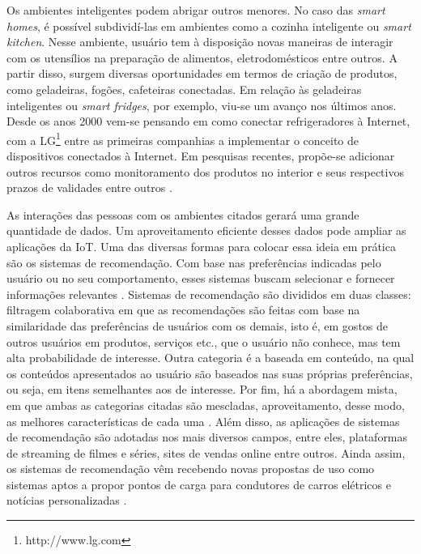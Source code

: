 Os ambientes inteligentes podem abrigar outros menores. No caso das \textit{smart homes}, é possível subdividí-las em ambientes como a cozinha inteligente ou \textit{smart kitchen}. Nesse ambiente, usuário tem à disposição novas maneiras de interagir com os utensílios na preparação de alimentos, eletrodomésticos entre outros. A partir disso, surgem diversas oportunidades em termos de criação de produtos, como geladeiras, fogões, cafeteiras conectadas. Em relação às geladeiras inteligentes ou \textit{smart fridges}, por exemplo, viu-se um avanço nos últimos anos. Desde os anos 2000 vem-se pensando em como conectar refrigeradores à Internet, com a LG\textsuperscript{\textregistered}\footnote{http://www.lg.com} entre as primeiras companhias a implementar o conceito de dispositivos conectados à Internet. Em pesquisas recentes, propõe-se adicionar outros recursos como monitoramento dos produtos no interior e seus respectivos prazos de validades entre outros \cite{Hachani2016}. 

As interações das pessoas com os ambientes citados gerará uma grande quantidade de dados. Um aproveitamento eficiente desses dados pode ampliar as aplicações da IoT. Uma das diversas formas para colocar essa ideia em prática são os sistemas de recomendação. Com base nas preferências indicadas pelo usuário ou no seu comportamento, esses sistemas buscam selecionar e fornecer informações relevantes \cite{Filho2008}. Sistemas de recomendação são divididos em duas classes: filtragem colaborativa em que as recomendações são feitas com base na similaridade das preferências de usuários com os demais, isto é, em gostos de outros usuários em produtos, serviços etc., que o usuário não conhece, mas tem alta probabilidade de interesse. Outra categoria é a baseada em conteúdo, na qual os conteúdos apresentados ao usuário são baseados nas suas próprias preferências, ou seja, em itens semelhantes aos de interesse. Por fim, há a abordagem mista, em que ambas as categorias citadas são mescladas, aproveitamento, desse modo, as melhores características de cada uma \cite{Thomas2016}.
Além disso, as aplicações de sistemas de recomendação são adotadas nos mais diversos campos, entre eles, plataformas de streaming de filmes e séries, sites de vendas online entre outros. Ainda assim, os sistemas de recomendação vêm recebendo novas propostas de uso como sistemas aptos a propor pontos de carga para condutores de carros elétricos \cite{Ferreira2011} e notícias personalizadas \cite{Yeung2010}. 


